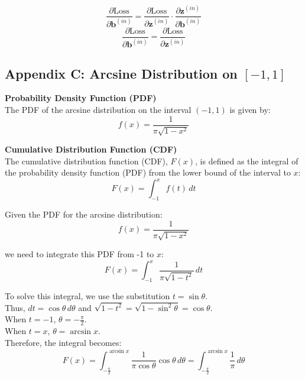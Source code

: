 \documentclass{ioereport}
\begin{document}
\begin{enumerate}[label=\textbf{\roman*.}]
         \[
  \frac{\partial \text{Loss}}{\partial \mathbf{b}^{(in)}} = \frac{\partial \text{Loss}}{\partial \mathbf{z}^{(in)}} \cdot \frac{\partial \mathbf{z}^{(in)}}{\partial \mathbf{b}^{(in)}}
  \]
  \[
  \frac{\partial \text{Loss}}{\partial \mathbf{b}^{(in)}} = \frac{\partial \text{Loss}}{\partial \mathbf{z}^{(in)}}
  \]
\end{enumerate}

\pagebreak


\subsection*{Appendix C: Arcsine Distribution on \([-1, 1]\)}

\textbf{Probability Density Function (PDF)}\\
The PDF of the arcsine distribution on the interval \((-1, 1)\) is given by:
\[
f(x) = \frac{1}{\pi \sqrt{1-x^2}}
\]

\textbf{Cumulative Distribution Function (CDF)}\\
The cumulative distribution function (CDF), \( F(x) \), is defined as the integral of the probability density function (PDF) from the lower bound of the interval to \( x \):
\[
F(x) = \int_{-1}^{x} f(t) \, dt
\]

Given the PDF for the arcsine distribution:
\[
f(x) = \frac{1}{\pi \sqrt{1-x^2}}
\]

we need to integrate this PDF from -1 to \( x \):
\[
F(x) = \int_{-1}^{x} \frac{1}{\pi \sqrt{1-t^2}} \, dt
\]

To solve this integral, we use the substitution \( t = \sin \theta \).\\
Thus, \( dt = \cos \theta \, d\theta \) and \( \sqrt{1-t^2} = \sqrt{1-\sin^2 \theta} = \cos \theta \).\\
When \( t = -1 \), \( \theta = -\frac{\pi}{2} \).\\
When \( t = x \), \( \theta = \arcsin x \).\\
Therefore, the integral becomes:
\[
F(x) = \int_{-\frac{\pi}{2}}^{\arcsin x} \frac{1}{\pi \cos \theta} \cos \theta \, d\theta = \int_{-\frac{\pi}{2}}^{\arcsin x} \frac{1}{\pi} \, d\theta
\]
\end{document}
